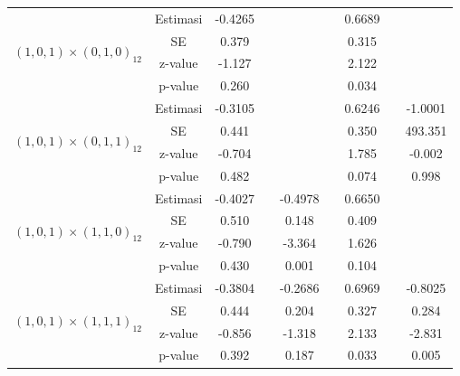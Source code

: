 \begin{enumerate}[label=\alph*.]
\begin{longtable}{|c|c|c|c|c|c|c|c|c|}
            \multirow{4}{*}{$(1,0,1)\times(0,1,0)_{12}$}
            & Estimasi & -0.4265  & {} & {} & {} & 0.6689 & {} & {}\\ \cline{2-9}
            & SE       & 0.379 & {} & {} & {} & 0.315 & {} & {}\\ \cline{2-9}
            & z-value  & -1.127   & {} & {} & {} & 2.122 & {}& {}\\ \cline{2-9}
            & p-value  & 0.260 & {} & {} & {} & 0.034 & {} & {}\\ \hline

            \multirow{4}{*}{$(1,0,1)\times(0,1,1)_{12}$}
            & Estimasi & -0.3105  & {} & {} & {} & 0.6246 & {} & -1.0001\\ \cline{2-9}
            & SE       & 0.441 & {} & {} & {} & 0.350 & {} & 493.351\\ \cline{2-9}
            & z-value  & -0.704  & {} & {} & {} & 1.785 & {}& -0.002\\ \cline{2-9}
            & p-value  & 0.482 & {} & {} & {} & 0.074 & {} & 0.998\\ \hline

            \multirow{4}{*}{$(1,0,1)\times(1,1,0)_{12}$}
            & Estimasi & -0.4027  & {} & -0.4978 & {} & 0.6650 & {} & {}\\ \cline{2-9}
            & SE       & 0.510 & {} & 0.148 & {} & 0.409 & {} & {}\\ \cline{2-9}
            & z-value  & -0.790  & {} & -3.364 & {} & 1.626 & {}& {}\\ \cline{2-9}
            & p-value  & 0.430 & {} & 0.001 & {} &  0.104 & {} & {}\\ \hline

            \multirow{4}{*}{$(1,0,1)\times(1,1,1)_{12}$}
            & Estimasi & -0.3804  & {} & -0.2686 & {} & 0.6969 & {} & -0.8025\\ \cline{2-9}
            & SE       & 0.444 & {} & 0.204 & {} & 0.327 & {} & 0.284\\ \cline{2-9}
            & z-value  & -0.856  & {} & -1.318 & {} & 2.133 & {}& -2.831\\ \cline{2-9}
            & p-value  & 0.392 & {} &  0.187 & {} & 0.033 & {} & 0.005\\ \hline


\end{longtable}
\end{enumerate}
